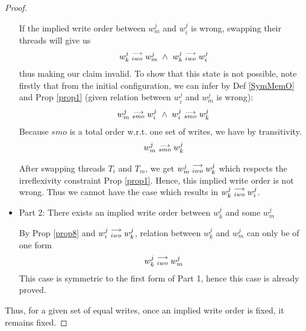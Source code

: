 \begin{proof}
\begin{itemize}
                        If the implied write order between $w_m^j$ and $w_i^j$ is wrong, swapping their threads will give us 
                        \begin{align*}
                            \reln{w_k^j}{iwo}{w_m^j} \ \wedge \ \reln{w_k^j}{iwo}{w_i^j}  
                        \end{align*}
                        thus making our claim invalid. To show that this state is not possible, note firstly that from the initial  configuration, we can infer by Def \ref{SymMemO} and Prop \ref{prop1} (given relation between $w_i^j$ and $w_m^j$ is wrong):
                        \begin{align*}
                            \reln{w_m^j}{smo}{w_i^j} \ \wedge \ \reln{w_i^j}{smo}{w_k^j}
                        \end{align*}
                        Because $smo$ is a total order w.r.t. one set of writes, we have by transitivity. 
                        \begin{align*}
                            w_m^j\stackrel{\longrightarrow}{_{smo}}w_k^j
                        \end{align*}

                        After swapping threads $T_i$ and $T_m$, we get $w_m^j\stackrel{\longrightarrow}{_{iwo}}w_k^j$ which respects the irreflexivity constraint Prop \ref{prop1}. Hence, this implied write order is not wrong. Thus we cannot have the case which results in $w_k^j\stackrel{\longrightarrow}{_{iwo}}w_i^j$.

                    \item Part 2: There exists an implied write order between $w_k^j$ and some $w_m^j$
                    
                        By Prop \ref{prop8} and $w_i^j\stackrel{\longrightarrow}{_{iwo}}w_k^j$, relation between $w_k^j$ and $w_m^j$ can only be of one form 
                        \begin{align*}
                            w_k^j\stackrel{\longrightarrow}{_{iwo}}w_m^j
                        \end{align*}
                        This case is symmetric to the first form of Part 1, hence this case is already proved. 
                
                \end{itemize}
 
            Thus, for a given set of equal writes, once an implied write order is fixed, it remains fixed.
        \end{proof}


